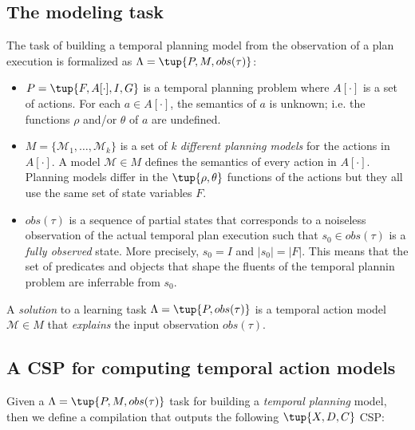 \documentclass[runningheads]{llncs}
\begin{document}
\subsection{The modeling task}
The task of building a temporal planning model from the observation of a plan execution is formalized as $\Lambda=\tup{P,M,obs(\tau)}$:
\begin{itemize}
\item $P=\tup{F,A[\cdot],I,G}$ is a temporal planning problem where $A[\cdot]$ is a set of actions. For each $a\in A[\cdot]$, the semantics of $a$ is unknown; i.e. the functions $\rho$ and/or $\theta$ of $a$ are undefined.
\item $M=\{\mathcal{M}_1,\ldots,\mathcal{M}_k\}$ is a set of {\em k different planning models} for the actions in $A[\cdot]$. A model $\mathcal{M}\in M$ defines the semantics of every action in $A[\cdot]$. Planning models differ in the $\tup{\rho,\theta}$ functions of the actions but they all use the same set of state variables $F$.
\item $obs(\tau)$ is a sequence of partial states that corresponds to a noiseless observation of the actual temporal plan execution such that $s_0\in obs(\tau)$ is a {\em fully observed} state. More precisely, $s_0=I$ and $|s_0|=|F|$. This means that the set of predicates and objects that shape the fluents of the temporal plannin problem are inferrable from $s_0$.
\end{itemize}

A {\em solution} to a learning task $\Lambda=\tup{P,obs(\tau)}$ is a temporal action model $\mathcal{M}\in M$ that {\em explains} the input observation $obs(\tau)$.

\subsection{A CSP for computing temporal action models}
Given a $\Lambda=\tup{P,M,obs(\tau)}$ task for building a {\em temporal planning} model, then we define a compilation that outputs the following $\tup{X,D,C}$ CSP:
\end{document}

